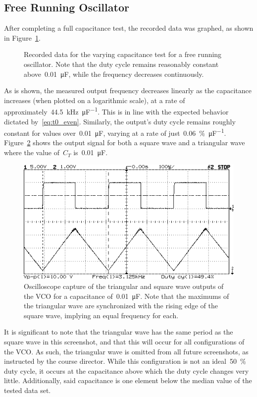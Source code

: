 \subsection{Free Running Oscillator}
After completing a full capacitance test, the recorded data was graphed, as
shown in Figure~\ref{fig:free_run_c}.
%
\begin{figure}[H]
	\centering
	
	\parbox{.6\textwidth}{
	\caption[Free Running Oscillator --- Varying $C_T$]{Recorded data for the
	varying capacitance test for a free running oscillator.  Note that the duty
	cycle remains reasonably constant above~\SI{0.01}{\micro\farad}, while the
	frequency decreases continuously.}
	\label{fig:free_run_c}}
\end{figure}
%
As is shown, the measured output frequency decreases linearly as the
capacitance increases (when plotted on a logarithmic scale), at a rate of
approximately~\SI{44.5}{\kilo\hertz\per\micro\farad}.  This is in line with the
expected behavior dictated by~\eqref{eq:t0_even}.  Similarly, the output's duty
cycle remains roughly constant for values over~\SI{0.01}{\micro\farad}, varying
at a rate of just~\SI{0.06}{\percent\per\micro\farad}.  Figure~\ref{fig:shot1}
shows the output signal for both a square wave and a triangular wave where the
value of~$C_T$ is~\SI{0.01}{\micro\farad}.
%
\begin{figure}[H]
	\centering
	\includegraphics[width=.6\textwidth]{img/shot/shot1.png}
	\parbox{.6\textwidth}{
	\caption[Free Running Oscillator --- Varying~$C_T$ at~\SI{49.9}{\percent}
	Duty Cycle]{Oscilloscope capture of the triangular and square wave outputs
	of the VCO for a capacitance of~\SI{0.01}{\micro\farad}.  Note that the
	maximums of the triangular wave are synchronized with the rising edge of
	the square wave, implying an equal frequency for each.}
	\label{fig:shot1}}
\end{figure}
%
It is significant to note that the triangular wave has the same period as the
square wave in this screenshot, and that this will occur for all configurations
of the VCO.  As such, the triangular wave is omitted from all future
screenshots, as instructed by the course director.  While this configuration is
not an ideal~\SI{50}{\percent} duty cycle, it occurs at the capacitance above which
the duty cycle changes very little.  Additionally, said capacitance is one
element below the median value of the tested data set.

